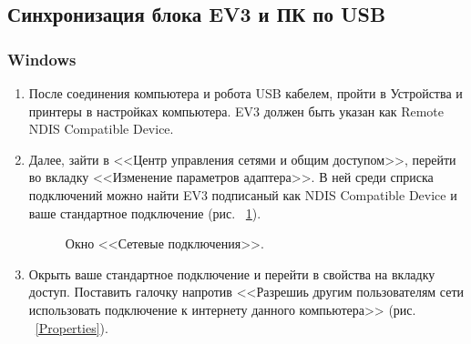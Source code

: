 \documentclass[12pt,a4paper,openany]{extarticle}
\begin{document}
\subsection{Синхронизация блока EV3 и ПК по USB}
\subsubsection{Windows} 

\begin{enumerate}
\item После соединения компьютера и робота USB кабелем, пройти в Устройства и принтеры в настройках компьютера. EV3 должен быть указан как Remote NDIS Compatible Device.
\item Далее, зайти в <<Центр управления сетями и общим доступом>>, перейти во вкладку <<Изменение параметров адаптера>>. В ней среди сприска подключений можно найти EV3 подписаный как NDIS Compatible Device и ваше стандартное подключение (рис. ~\ref{Network_connections}). 

\begin{figure}[h!]
	\noindent{}
	\caption{Окно <<Сетевые подключения>>.}
	\label{Network_connections}
\end{figure}

\item Окрыть ваше стандартное подключение и перейти в свойства на вкладку доступ. Поставить галочку напротив <<Разрешиь другим пользователям сети использовать подключение к интернету данного компьютера>> (рис. ~\ref{Properties}).


\end{enumerate}
\end{document}
